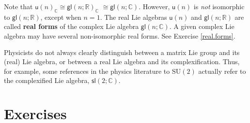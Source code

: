 \documentclass[12pt]{amsbook}
\theoremstyle{plain}
\numberwithin{equation}{chapter}
\numberwithin{theorem}{chapter}
\begin{document}
Note that $\mathsf{u}(n)_{\mathbb{C}}\cong\mathsf{gl}\left(  n;\mathbb{R}%
\right)  _{\mathbb{C}}$ $\cong\mathsf{gl}(n;\mathbb{C})$. However,
$\mathsf{u}(n)$ is \textit{not} isomorphic to $\mathsf{gl}\left(
n;\mathbb{R}\right)  $, except when $n=1$. The real Lie algebras
$\mathsf{u}(n)$ and $\mathsf{gl}\left(  n;\mathbb{R}\right)  $ are called
\textbf{real forms} of the complex Lie algebra $\mathsf{gl}(n;\mathbb{C})$. A
given complex Lie algebra may have several non-isomorphic real forms. See
Exercise \ref{real.forms}.

Physicists do not always clearly distinguish between a matrix Lie group and
its (real) Lie algebra, or between a real Lie algebra and its
complexification. Thus, for example, some references in the physics literature
to \textsf{SU}$(2)$ actually refer to the complexified Lie algebra,
$\mathsf{sl}(2;\mathbb{C})$.

\section{Exercises}
\end{document}
